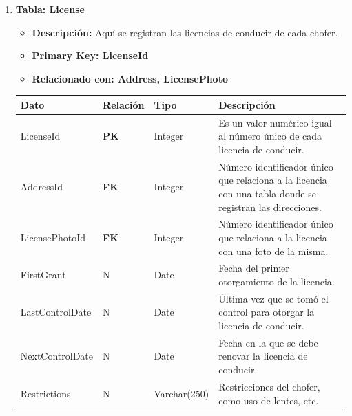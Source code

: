 \documentclass[12pt]{article}
\begin{document}
\begin{enumerate}
    \item \textbf{Tabla: License}
    \begin{itemize}
        \item \textbf{Descripción:} Aquí se registran las licencias de conducir de cada chofer.
        \item \textbf{Primary Key: LicenseId}
        \item \textbf{Relacionado con: Address, LicensePhoto}
    \end{itemize}
    \begin{table}[!h]
        \centering
        \begin{tabular}{|p{3cm}|p{2cm}|p{2.5cm}|p{8cm}|}
             \hline
             \textbf{Dato} & \textbf{Relación} & \textbf{Tipo} & \textbf{Descripción} \\
             \hline
             LicenseId & \textbf{PK} & Integer & Es un valor numérico igual al número único de cada licencia de conducir. \\
             \hline
             AddressId & \textbf{FK} & Integer & Número identificador único que relaciona a la licencia con una tabla donde se registran las direcciones.\\
             \hline
             LicensePhotoId & \textbf{FK} & Integer & Número identificador único que relaciona a la licencia con una foto de la misma.\\
             \hline
             FirstGrant & N & Date & Fecha del primer otorgamiento de la licencia. \\
             \hline
             LastControlDate & N & Date & Última vez que se tomó el control para otorgar la licencia de conducir.\\
             \hline
             NextControlDate & N & Date & Fecha en la que se debe renovar la licencia de conducir.\\
             \hline
             Restrictions & N & Varchar(250) & Restricciones del chofer, como uso de lentes, etc. \\
             \hline
        \end{tabular}
    \end{table}


\end{enumerate}
\end{document}
